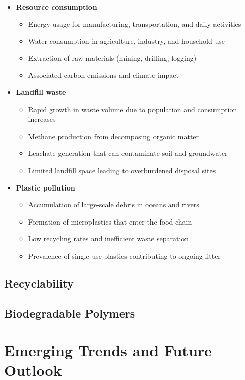 \documentclass[11pt,a4paper]{article}
\begin{document}
\begin{itemize}
\item \textbf{Resource consumption}
  \begin{itemize}
\item Energy usage for manufacturing, transportation, and daily activities
\item Water consumption in agriculture, industry, and household use
\item Extraction of raw materials (mining, drilling, logging)
\item Associated carbon emissions and climate impact
  \end{itemize}
\item \textbf{Landfill waste}
  \begin{itemize}
\item Rapid growth in waste volume due to population and consumption increases
\item Methane production from decomposing organic matter
\item Leachate generation that can contaminate soil and groundwater
\item Limited landfill space leading to overburdened disposal sites
  \end{itemize}
\item \textbf{Plastic pollution}
  \begin{itemize}
\item Accumulation of large‑scale debris in oceans and rivers
\item Formation of microplastics that enter the food chain
\item Low recycling rates and inefficient waste separation
\item Prevalence of single‑use plastics contributing to ongoing litter
  \end{itemize}
\end{itemize}

\subsection{Recyclability}

\subsection{Biodegradable Polymers}

\section{Emerging Trends and Future Outlook}
\end{document}
